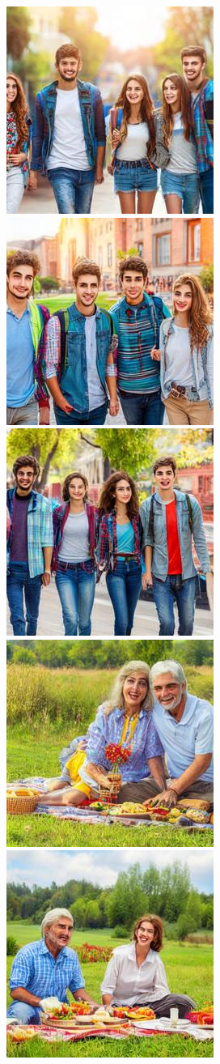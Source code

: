 \begin{figure}[h!]
\begin{subfigure}[t]{0.32\linewidth}
    	\includegraphics[width=0.32\linewidth]{figs/samples_appendix_4/adjmat_cfg_2_ode_prompt_35_image_0.jpg}\;%
    	\includegraphics[width=0.32\linewidth]{figs/samples_appendix_4/adjmat_cfg_2_ode_prompt_35_image_1.jpg}\;%
    	\includegraphics[width=0.32\linewidth]{figs/samples_appendix_4/adjmat_cfg_2_ode_prompt_35_image_2.jpg}\\ 
    	\includegraphics[width=0.32\linewidth]{figs/samples_appendix_4/adjmat_cfg_2_ode_prompt_51_image_0.jpg}\;%
    	\includegraphics[width=0.32\linewidth]{figs/samples_appendix_4/adjmat_cfg_2_ode_prompt_51_image_1.jpg}\;%

\end{subfigure}
\end{figure}
